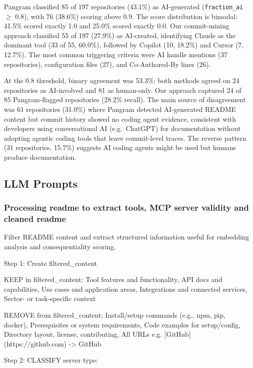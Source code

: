 \documentclass[manuscript,screen,nonacm,oneside]{acmart}
\begin{document}
Pangram classified 85 of 197 repositories (43.1\%) as AI-generated (\texttt{fraction\_ai} $\geq$ 0.8), with 76 (38.6\%) scoring above 0.9. The score distribution is bimodal: 41.5\% scored exactly 1.0 and 25.0\% scored exactly 0.0. Our commit-mining approach classified 55 of 197 (27.9\%) as AI-created, identifying Claude as the dominant tool (33 of 55, 60.0\%), followed by Copilot (10, 18.2\%) and Cursor (7, 12.7\%). The most common triggering criteria were AI handle mentions
(37 repositories), configuration files (27), and Co-Authored-By lines (26).

At the 0.8 threshold, binary agreement was 53.3\%: both methods agreed on 24 repositories as AI-involved and 81 as human-only. Our approach captured 24 of 85  Pangram-flagged repositories (28.2\% recall). The main source of disagreement was 61 repositories (31.0\%) where Pangram detected AI-generated README content but commit history showed no coding agent evidence, consistent with developers using conversational
AI (e.g.\ ChatGPT) for documentation without adopting agentic coding tools that leave commit-level traces. The reverse pattern (31 repositories, 15.7\%) suggests AI coding agents might be used but humans produce documentation.

\subsection{LLM Prompts}
\label{app:prompts}

\subsubsection{Processing readme to extract tools, MCP server validity and cleaned readme}

Filter README content and extract structured information useful for embedding analysis and consequentiality scoring.

Step 1: Create filtered\_content

KEEP in filtered\_content: Tool features and functionality, API docs and capabilities, Use cases and application areas, Integrations and connected services, Sector- or task-specific context

REMOVE from filtered\_content: Install/setup commands (e.g., npm, pip, docker), Prerequisites or system requirements, Code examples for setup/config, Directory layout, license, contributing, All URLs e.g. {[}GitHub{]}(https://github.com) -\textgreater{} GitHub

Step 2: CLASSIFY server type:
\end{document}
